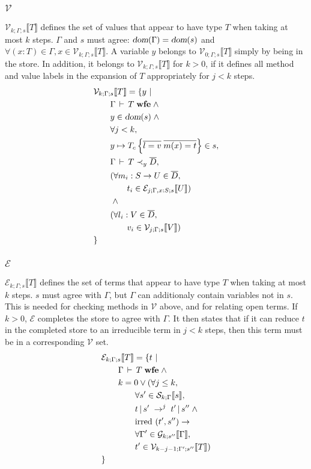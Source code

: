 \documentclass[9pt]{sigplanconf}
\newcommand{\gap}{\quad\quad}
\newcommand{\ts}{\,\vdash\,}
\newcommand{\dom}{\mbox{\sl dom}}
\newcommand{\expand}{\prec}
\newcommand{\wfe}{\;\mbox{\textbf{wfe}}}
\newcommand{\ldefs}[1]{\left\{#1\right\}}
\newcommand{\seq}[1]{\overline{#1}}
\newcommand{\envplus}[1]{, #1}
\newcommand{\relv}[4]{\mathcal{V}_{#1;#2;#3}\llbracket#4\rrbracket}
\newcommand{\rele}[4]{\mathcal{E}_{#1;#2;#3}\llbracket#4\rrbracket}
\newcommand{\rels}[3]{\mathcal{S}_{#1;#2}\llbracket#3\rrbracket}
\newcommand{\relg}[3]{\mathcal{G}_{#1;#2}\llbracket#3\rrbracket}
\newcommand{\irred}[2]{\text{irred }(#1,#2)}
\newcommand{\andl}{\;\wedge\;}
\newcommand{\orl}{\vee}
\newcommand{\impliesl}{\rightarrow}
\newcommand{\reductionl}[5]{#1 \operatorname{|} #2 \;\rightarrow^{#5}\; #3 \operatorname{|} #4}
\begin{document}
\subsubsection{$\mathcal{V}$}
$\relv k \Gamma s T$ defines the set of values that appear to have
type $T$ when taking at most $k$ steps. $\Gamma$ and $s$ must agree:
$\dom(\Gamma) = \dom(s)$ and $\forall (x : T) \in \Gamma, x \in \relv
k \Gamma s T$. A variable $y$ belongs to $\relv 0 \Gamma s T$ simply
by being in the store. In addition, it belongs to $\relv k \Gamma s T$
for $k > 0$, if it defines all method and value labels in the
expansion of $T$ appropriately for $j < k$ steps.
\begin{align*}
&\relv k \Gamma s T = \{ y \ |\\
&\gap \Gamma \ts T \wfe \andl\\
&\gap y \in \dom(s) \andl\\
&\gap \forall j < k,\\
&\gap y \mapsto T_c \ldefs{\seq{l = v}\;\seq{m(x)=t}} \in s,\\
&\gap \Gamma \ts T \expand_y \seq{D},\\
&\gap (\forall m_i : S \rightarrow U \in \seq{D},\\
&\gap\gap t_i \in \rele j {\Gamma \envplus{x : S}} s U)\\
&\gap \andl\\
&\gap (\forall l_i : V \in \seq{D},\\
&\gap\gap v_i \in \relv j \Gamma s V)\\
&\}
\end{align*}

\subsubsection{$\mathcal{E}$}
$\rele k \Gamma s T$ defines the set of terms that appear to have type
$T$ when taking at most $k$ steps. $s$ must agree with $\Gamma$, but
$\Gamma$ can additionaly contain variables not in $s$. This is needed
for checking methods in $\mathcal{V}$ above, and for relating open
terms. If $k > 0$, $\mathcal{E}$ completes the store to agree with
$\Gamma$. It then states that if it can reduce $t$ in the completed
store to an irreducible term in $j < k$ steps, then this term must be
in a corresponding $\mathcal{V}$ set.
\begin{align*}
&\rele k \Gamma s T = \{ t \ |\\
&\gap \Gamma \ts T \wfe \andl\\
&\gap k = 0 \orl (\forall j \leq k,\\
&\gap\gap \forall s' \in \rels k \Gamma s ,\\
&\gap\gap \reductionl t {s'} {t'} {s''} j \andl\\
&\gap\gap \irred {t'} {s''} \impliesl\\
&\gap\gap \forall \Gamma' \in \relg k {s''} \Gamma ,\\
&\gap\gap {t'} \in \relv {k-j-1} {\Gamma'} {s''} T)\\
&\}
\end{align*}
\end{document}
